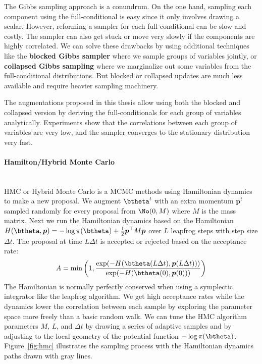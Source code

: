 The Gibbs sampling approach is a conundrum.
On the one hand, sampling each component using the full-conditional is easy since it only involves drawing a scalar.
However, reforming a sampler for each full-conditional can be slow and costly.
The sampler can also get stuck or move very slowly if the components are highly correlated.
We can solve these drawbacks by using additional techniques like the \textbf{blocked Gibbs sampler} \cite{jensen1995blocking} where we sample groups of variables jointly, or \textbf{collapsed Gibbs sampling} \cite{liu1994collapsed} where we marginalize out some variables from the full-conditional distributions.
But blocked or collapsed updates are much less available and require heavier sampling machinery.

The augmentations proposed in this thesis allow using both the blocked and collapsed version by deriving the full-conditionals for each group of variables analytically.
Experiments show that the correlations between each group of variables are very low, and the sampler converges to the stationary distribution very fast.


\paragraph{Hamilton/Hybrid Monte Carlo}\mbox{}\\
\label{sec:hmc}
\acf{HMC} or Hybrid Monte Carlo \cite{duane1987hybrid, betancourt2017conceptual} is a \ac{MCMC} methods using Hamiltonian dynamics to make a new proposal.
We augment $\btheta^t$ with an extra momentum $\boldsymbol{p}^t$ sampled randomly for every proposal from $\No(0,M)$ where $M$ is the mass matrix.
Next we run the Hamiltonian dynamics based on the Hamiltonian $H(\btheta, \boldsymbol{p}) = -\log \pi(\btheta) + \frac{1}{2}\boldsymbol{p}^\top M \boldsymbol{p}$ over $L$ leapfrog steps with step size $\Delta t$.
The proposal at time $L\Delta t$ is accepted or rejected based on the acceptance rate:
\begin{align*}
    A = \min\left(1, \frac{\exp(-H(\btheta(L\Delta t), \boldsymbol{p}(L\Delta t)))}{\exp(-H(\btheta(0), \boldsymbol{p}(0)))}\right)
\end{align*}
The Hamiltonian is normally perfectly conserved when using a symplectic integrator like the leapfrog algorithm.
We get high acceptance rates while the dynamics lower the correlation between each sample by exploring the parameter space more freely than a basic random walk.
We can tune the \ac{HMC} algorithm parameters $M$, $L$, and $\Delta t$ by drawing a series of adaptive samples and by adjusting to the local geometry of the potential function $-\log\pi(\btheta)$.
Figure~\ref{fig:hmc} illustrates the sampling process with the Hamiltonian dynamics paths drawn with gray lines.

